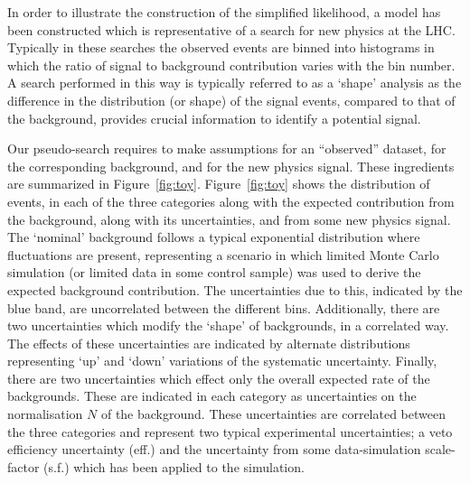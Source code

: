 \documentclass[11pt]{article}
\begin{document}
In order to illustrate the construction of the simplified likelihood, a model has been constructed which is representative of a search for new physics at the LHC. Typically in these searches the observed events are binned into histograms in which the ratio of signal to background contribution varies with the bin number. A search performed in this way is typically referred to as a `shape' analysis as the difference in the distribution (or shape) of the signal events, compared to that of the background, provides crucial information to identify a potential signal.


Our pseudo-search requires to make  assumptions for an ``observed'' dataset, for the corresponding background, and for the new physics signal.  These ingredients are summarized in Figure~\ref{fig:toy}. 
Figure~\ref{fig:toy} shows the distribution of events, in each of the three categories along with the expected contribution from the background, along with its uncertainties, and from some new physics signal.
The `nominal' background follows a typical exponential distribution where fluctuations are present, representing a scenario in which limited Monte Carlo simulation (or limited data in some control sample) was used
to derive the expected background contribution. The uncertainties due to this, indicated by the blue band, are uncorrelated between the different bins. Additionally, there are two uncertainties which modify the `shape' of
backgrounds, in a correlated way. The effects of these uncertainties are indicated by alternate distributions representing `up' and `down' variations of the systematic uncertainty. Finally, there are two uncertainties
which effect only the overall expected rate of the backgrounds. These are indicated in each category as uncertainties on the normalisation $N$ of the background. These uncertainties are correlated between the three categories
and represent two typical experimental uncertainties; a veto efficiency uncertainty (eff.) and the uncertainty from some data-simulation scale-factor (s.f.) which has been applied to the simulation.
\end{document}
